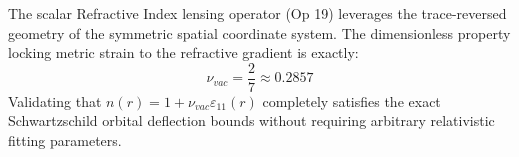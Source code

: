 The scalar Refractive Index lensing operator (Op 19) leverages the trace-reversed geometry of the symmetric spatial coordinate system. The dimensionless property locking metric strain to the refractive gradient is exactly:
\begin{equation}
    \nu_{vac} = \frac{2}{7} \approx 0.2857
\end{equation}
Validating that $n(r) = 1 + \nu_{vac} \varepsilon_{11}(r)$ completely satisfies the exact Schwartzschild orbital deflection bounds without requiring arbitrary relativistic fitting parameters. \\
